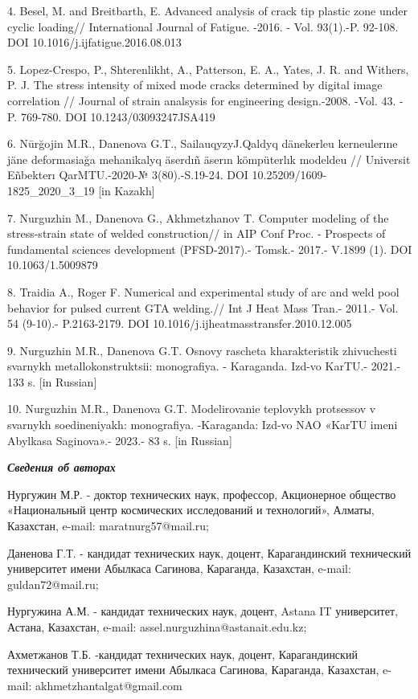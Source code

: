 4. Besel, M. and Breitbarth, E. Advanced analysis of crack tip plastic
zone under cyclic loading// International Journal of Fatigue. -2016. -
Vol. 93(1).-P. 92-108. DOI 10.1016/j.ijfatigue.2016.08.013

5. Lopez-Crespo, P., Shterenlikht, A., Patterson, E. A., Yates, J. R.
and Withers, P. J. The stress intensity of mixed mode cracks determined
by digital image correlation // Journal of strain analsysis for
engineering design.-2008. -Vol. 43. - P. 769-780. DOI
10.1243/03093247JSA419

6. Nūrğojin M.R., Danenova G.T., SailauqyzyJ.Qaldyq dänekerleu
kerneulerıne jäne deformasiağa mehanikalyq äserdıñ äserın kömpüterlık
modeldeu // Universit Eñbekterı QarMTU.-2020-№ 3(80).-S.19-24. DOI
10.25209/1609- 1825\_2020\_3\_19 {[}in Kazakh{]}

7. Nurguzhin M., Danenova G., Akhmetzhanov T. Computer modeling of the
stress-strain state of welded construction// in AIP Conf Proc. -
Prospects of fundamental sciences development (PFSD-2017).- Tomsk.-
2017.- V.1899 (1). DOI 10.1063/1.5009879

8. Traidia A., Roger F. Numerical and experimental study of arc and weld
pool behavior for pulsed current GTA welding.// Int J Heat Mass Tran.-
2011.- Vol. 54 (9-10).- P.2163-2179. DOI
10.1016/j.ijheatmasstransfer.2010.12.005

9. Nurguzhin M.R., Danenova G.T. Osnovy rascheta kharakteristik
zhivuchesti svarnykh metallokonstruktsii: monografiya. - Karaganda.
Izd-vo KarTU.- 2021.- 133 s. {[}in Russian{]}

10. Nurguzhin M.R., Danenova G.T. Modelirovanie teplovykh protsessov v
svarnykh soedineniyakh: monografiya. -Karaganda: Izd-vo NAO «KarTU imeni
Abylkasa Saginova».- 2023.- 83 s. {[}in Russian{]}

\emph{{\bfseries Сведения об авторах}}

Нургужин М.Р. - доктор технических наук, профессор, Акционерное общество
«Национальный центр космических исследований и технологий», Алматы,
Казахстан, e-mail: maratnurg57@mail.ru;

Даненова Г.Т. - кандидат технических наук, доцент, Карагандинский
технический университет имени Абылкаса Сагинова, Караганда, Казахстан,
e-mail: guldan72@mail.ru;

Нургужина А.М. - кандидат технических наук, доцент, Astana IT
университет, Астана, Казахстан, e-mail:
assel.nurguzhina@astanait.edu.kz;

Ахметжанов Т.Б. -кандидат технических наук, доцент, Карагандинский
технический университет имени Абылкаса Сагинова, Караганда, Казахстан,
e-mail: akhmetzhantalgat@gmail.com

